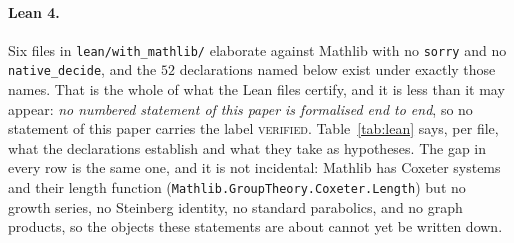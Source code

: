 \documentclass[11pt,a4paper]{article}
\theoremstyle{definition}
\theoremstyle{remark}
\theoremstyle{plain}
\begin{document}
\paragraph{Lean 4.}
Six files in \texttt{lean/with\_mathlib/} elaborate against Mathlib with no \texttt{sorry} and
no \texttt{native\_decide}, and the $52$ declarations named below exist under exactly those
names. That is the whole of what the Lean files certify, and it is less than it may appear:
\emph{no numbered statement of this paper is formalised end to end}, so no statement of this
paper carries the label \textsc{verified}. Table~\ref{tab:lean} says, per file, what the
declarations establish and what they take as hypotheses. The gap in every row is the same
one, and it is not incidental: Mathlib has Coxeter systems and their length function
(\texttt{Mathlib.GroupTheory.Coxeter.Length}) but no growth series, no Steinberg identity, no
standard parabolics, and no graph products, so the objects these statements are about cannot
yet be written down.
\end{document}
